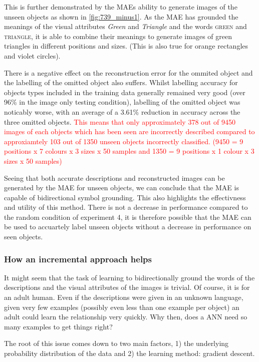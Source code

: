 This is further demonstrated by the \acp{MAE} ability to generate images of the unseen objects as shown in \autoref{fig:739_minus1}. As the \ac{MAE} has grounded the meanings of the visual attributes \textit{Green} and \textit{Triangle} and the words \textsc{green} and \textsc{triangle}, it is able to combine their meanings to generate images of green triangles in different positions and sizes. (This is also true for orange rectangles and violet circles).

There is a negative effect on the reconstruction error for the ommited object and the labelling of the omitted object also suffers. Whilst labelling accuracy for objects types included in the training data generally remained very good (over 96\% in the image only testing condition), labelling of the omitted object was noticably worse, with an average of a 3.61\% reduction in accuracy across the three omitted objects. \textcolor{red}{This means that only approximately 378 out of 9450 images of each objects which has been seen are incorrectly described compared to approxiamtely 103 out of 1350 unseen objects incorrectly classified. (9450 = 9 positions x 7 colours x 3 sizes x 50 samples and 1350 = 9 positions x 1 colour x 3 sizes x 50 samples) }

Seeing that both accurate descriptions and reconstructed images can be generated by the \ac{MAE} for unseen objects, we can conclude that the \ac{MAE} is capable of bidirectional symbol grounding. This also highlights the effectivness and utility of this method. There is not a decrease in performance compared to the random condition of experiment 4, it is therefore possible that the \ac{MAE} can be used to accuartely label unseen objects without a decrease in performance on seen objects.


\subsubsection{How an incremental approach helps}
It might seem that the task of learning to bidirectionally ground the words of the descriptions and the visual attributes of the images is trivial. Of course, it is for an adult human. Even if the descriptions were given in an unknown language, given very few examples (possibly even less than one example per object) an adult could learn the relationship very quickly. Why then, does a \ac{ANN} need so many examples to get things right?

The root of this issue comes down to two main factors, 1) the underlying probability distribution of the data and 2) the learning method: gradient descent.

